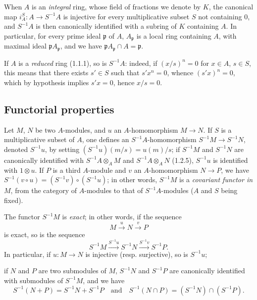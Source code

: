 \begin{env}[1.2.7]
\label{0.1.2.7}
When $A$ is an \emph{integral} ring, whose field of fractions we denote by $K$, the canonical map $i_A^S:A\to S^{-1}A$ is injective for every multiplicative subset $S$ not containing $0$, and $S^{-1}A$ is then canonically identified with a subring of $K$ containing $A$.
In particular, for every prime ideal $\mathfrak{p}$ of $A$, $A_{\mathfrak{p}}$ is a local ring containing $A$, with maximal ideal $\mathfrak{p}A_{\mathfrak{p}}$, and we have $\mathfrak{p}A_{\mathfrak{p}}\cap A=\mathfrak{p}$.
\end{env}

\begin{env}[1.2.8]
\label{0.1.2.8}
If $A$ is a \emph{reduced} ring (1.1.1), so is $S^{-1}A$: indeed, if $(x/s)^n=0$ for $x\in A$, $s\in S$, this means that there exists $s'\in S$ such that $s'x^n=0$, whence $(s'x)^n=0$, which by hypothesis implies $s'x=0$, hence $x/s=0$.
\end{env}

\subsection{Functorial properties}
\label{subsection:0.1.3}

\begin{env}[1.3.1]
\label{0.1.3.1}
Let $M$, $N$ be two $A$-modules, and $u$ an $A$-homomorphism $M\to N$.
If $S$ is a multiplicative subset of $A$, one defines an $S^{-1}A$-homomorphism $S^{-1}M\to S^{-1}N$, denoted $S^{-1}u$, by setting $(S^{-1}u)(m/s)=u(m)/s$; if $S^{-1}M$ and $S^{-1}N$ are canonically identified with $S^{-1}A\otimes_A M$ and $S^{-1}A\otimes_A N$ (1.2.5), $S^{-1}u$ is identified with $1\otimes u$.
If $P$ is a third $A$-module and $v$ an $A$-homomorphism $N\to P$, we have $S^{-1}(v\circ u)=(S^{-1}v)\circ(S^{-1}u)$; in other words, $S^{-1}M$ is a \emph{covariant functor in $M$}, from the category of $A$-modules to that of $S^{-1}A$-modules ($A$ and $S$ being fixed).
\end{env}

\begin{env}[1.3.2]
\label{0.1.3.2}
The functor $S^{-1}M$ is \emph{exact}; in other words, if the sequence
\[
  M\xrightarrow{u}N\xrightarrow{v}P
\]
is exact, so is the sequence
\[
  S^{-1}M\xrightarrow{S^{-1}u}S^{-1}N\xrightarrow{S^{-1}v}S^{-1}P.
\]
In particular, if $u:M\to N$ is injective (resp. surjective), so is $S^{-1}u$;

if $N$ and $P$ are two submodules of $M$, $S^{-1}N$ and $S^{-1}P$ are canonically identified with submodules of $S^{-1}M$, and we have
\[
  S^{-1}(N+P)=S^{-1}N+S^{-1}P
  \quad\text{and}\quad
  S^{-1}(N\cap P)=(S^{-1}N)\cap(S^{-1}P).
\]
\end{env}

